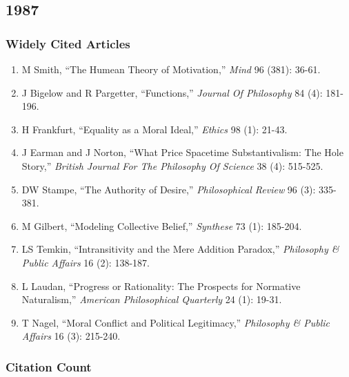 \documentclass[
  10pt,
  letterpaper,
  DIV=11,
  numbers=noendperiod,
  twoside]{scrartcl}
\providecommand{\tightlist}{%
  \setlength{\itemsep}{0pt}\setlength{\parskip}{0pt}}\usepackage{longtable,booktabs,array}
\begin{document}
\newpage

\subsection{1987}\label{sec-s1987}

\subsubsection*{Widely Cited Articles}\label{widely-cited-articles-11}

\begin{enumerate}
\def\labelenumi{\arabic{enumi}.}
\tightlist
\item
  M Smith, ``The Humean Theory of Motivation,'' \emph{Mind} 96 (381):
  36-61.
\item
  J Bigelow and R Pargetter, ``Functions,'' \emph{Journal Of Philosophy}
  84 (4): 181-196.
\item
  H Frankfurt, ``Equality as a Moral Ideal,'' \emph{Ethics} 98 (1):
  21-43.
\item
  J Earman and J Norton, ``What Price Spacetime Substantivalism: The
  Hole Story,'' \emph{British Journal For The Philosophy Of Science} 38
  (4): 515-525.
\item
  DW Stampe, ``The Authority of Desire,'' \emph{Philosophical Review} 96
  (3): 335-381.
\item
  M Gilbert, ``Modeling Collective Belief,'' \emph{Synthese} 73 (1):
  185-204.
\item
  LS Temkin, ``Intransitivity and the Mere Addition Paradox,''
  \emph{Philosophy \& Public Affairs} 16 (2): 138-187.
\item
  L Laudan, ``Progress or Rationality: The Prospects for Normative
  Naturalism,'' \emph{American Philosophical Quarterly} 24 (1): 19-31.
\item
  T Nagel, ``Moral Conflict and Political Legitimacy,'' \emph{Philosophy
  \& Public Affairs} 16 (3): 215-240.
\end{enumerate}

\subsubsection*{Citation Count}\label{sec-count-1987}
\end{document}
